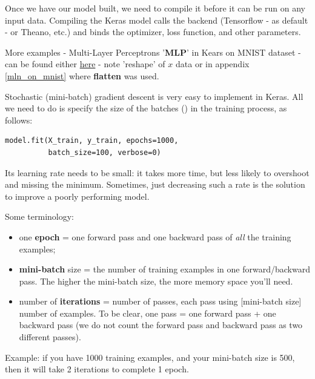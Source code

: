 \documentclass[11pt]{article}
\begin{document}
Once we have our model built, we need to compile it before it can be run on any input data. Compiling the Keras model calls the backend (Tensorflow - as default - or Theano, etc.) and binds the optimizer, loss function, and other parameters.

More examples - Multi-Layer Perceptrons '\textbf{MLP}' in Kears on MNIST dataset - can be found either \href{https://github.com/keras-team/keras/blob/master/examples/mnist_mlp.py}{here} - note 'reshape' of $x$ data or in appendix \ref{mln_on_mnist} where \textbf{flatten} was used.

Stochastic (mini-batch) gradient descent is very easy to implement in Keras. All we need to do is specify the size of the batches () in the training process, as follows:
\begin{lstlisting}
model.fit(X_train, y_train, epochs=1000, 
		  batch_size=100, verbose=0)
\end{lstlisting}
Its learning rate needs to be small: it takes more time, but less likely to overshoot and missing the minimum. Sometimes, just decreasing such a rate is the solution to improve a poorly performing model. 

Some terminology:
\begin{itemize}
	\item one \textbf{epoch} = one forward pass and one backward pass of \textit{all} the training examples;
	\item \textbf{mini-batch} size = the number of training examples in one forward/backward pass. The higher the mini-batch size, the more memory space you'll need.	
	\item number of \textbf{iterations} = number of passes, each pass using [mini-batch size] number of examples. To be clear, one pass = one forward pass + one backward pass (we do not count the forward pass and backward pass as two different passes).
\end{itemize}
Example: if you have 1000 training examples, and your mini-batch size is 500, then it will take 2 iterations to complete 1 epoch.
\end{document}
